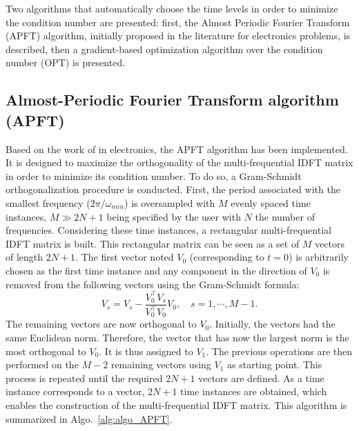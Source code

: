 
Two algorithms that automatically choose the time levels in order to
minimize the condition number are presented: first, the Almost
Periodic Fourier Transform (APFT) algorithm, initially proposed in the
literature for electronics problems, is described, then a gradient-based
optimization algorithm over the condition number (OPT) is presented.

\subsection{Almost-Periodic Fourier Transform algorithm (APFT)}
\label{sec:apft_algorithm}
Based on the work of \citet{Kundert1988} in
electronics, the APFT
algorithm has been implemented. It is designed
to maximize the orthogonality of the multi-frequential
IDFT matrix in order to minimize its condition number. To do so, a
Gram-Schmidt orthogonalization procedure is conducted.  First, the period 
associated with the smallest frequency ($2 \pi / \omega_{min}$) 
is oversampled with $M$ evenly spaced time
instances, $M\gg2N+1$ being specified by the user with $N$ the number of
frequencies. Considering these time instances, a rectangular
multi-frequential IDFT matrix is built. This rectangular matrix can be seen
as a set of $M$ vectors of length $2N+1$.
The first vector noted $V_0$ (corresponding
to $t=0$) is arbitrarily chosen as the first time instance and any
component in the direction of $V_0$ is removed from the following
vectors using the Gram-Schmidt formula:
\begin{equation}
   V_s = V_s - \frac{V_0^\top V_s}{V_0^\top V_0} V_0, \quad s=1,\cdots,M-1.
   \label{GramSchmidtAlgo}
\end{equation}
The remaining vectors are now orthogonal to $V_0$. 
Initially, the vectors had the same Euclidean norm.
Therefore, the vector that has now the largest norm is
the most orthogonal to $V_0$.
It is thus assigned to $V_1$. The previous
operations are then performed on the $M-2$ remaining vectors using $V_1$
as starting point. This process is repeated until the required $2N+1$ vectors
are defined. As a time instance corresponds to a vector, $2N+1$ time instances are obtained, 
which enables the construction of the multi-frequential
IDFT matrix. This algorithm is summarized in
Algo.~\ref{alg:algo_APFT}.

